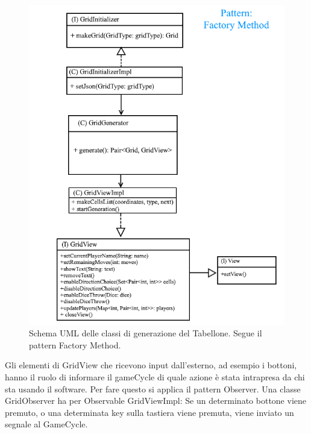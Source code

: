 \documentclass[a4paper,12pt]{report}
\begin{document}
\begin{figure}[!t]
\centering{}
\includegraphics[width=\textwidth]{images/gridImages/gridFactoryMethod.png}
\caption{Schema UML delle classi di generazione del Tabellone. Segue il pattern Factory Method.}
\label{img:gridfactorymethod}
\end{figure}

Gli elementi di GridView che ricevono input dall’esterno, ad esempio i bottoni, hanno il ruolo di informare il gameCycle di quale azione è stata intrapresa da chi sta usando il software.
%
Per fare questo si applica il pattern Observer.
%
Una classe GridObserver ha per Observable GridViewImpl: Se un determinato bottone viene premuto, o una determinata key sulla tastiera viene premuta, viene inviato un segnale al GameCycle.
\end{document}
